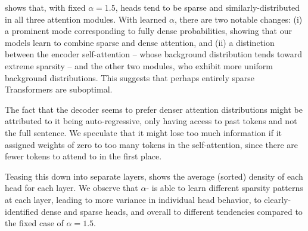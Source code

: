 \begin{sloppypar}
     shows that, with fixed $\alpha=1.5$, heads
    tend to be sparse and similarly-distributed in all three attention
    modules. With learned $\alpha$, there are two notable changes: (i) a
    prominent mode corresponding to fully dense probabilities, showing
    that our models learn to combine sparse and dense attention, and (ii)
    a distinction between the encoder self-attention -- whose background
    distribution tends toward extreme sparsity -- and the other two
    modules, who exhibit more uniform background distributions. This
    suggests that perhaps entirely sparse Transformers are suboptimal.
\end{sloppypar}

The fact that the decoder seems to prefer denser attention
distributions might be attributed to it being auto-regressive, only
having access to past tokens and not the full sentence. We speculate
that it might lose too much information if it assigned weights of
zero to too many tokens in the self-attention, since there are fewer
tokens to attend to in the first place.

Teasing this down into separate layers,
 shows the average (sorted) density of
each head for each layer. We observe that $\alpha$-\entmaxtext{} is
able to learn different sparsity patterns at each layer, leading to
more variance in individual head behavior, to clearly-identified
dense and sparse heads, and overall to different tendencies compared
to the fixed case of $\alpha=1.5$.

